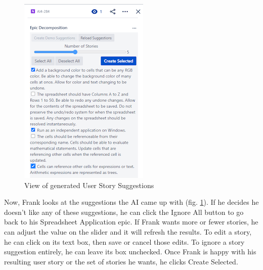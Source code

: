 \begin{figure}
\centerline{\includegraphics[width=\textwidth,height=\textheight,keepaspectratio]{./figure/Scenario1Figure2.png}}
\caption{View of generated User Story Suggestions}
\label{fig:Scenario1Figure2}
\end{figure}

Now, Frank looks at the suggestions the AI came up with (fig. \ref{fig:Scenario1Figure2}). If he decides he doesn’t like any of these suggestions, he can click the Ignore All button to go back to his Spreadsheet Application epic. If Frank wants more or fewer stories, he can adjust the value on the slider and it will refresh the results. To edit a story, he can click on its text box, then save or cancel those edits. To ignore a story suggestion entirely, he can leave its box unchecked. Once Frank is happy with his resulting user story or the set of stories he wants, he clicks Create Selected. 

